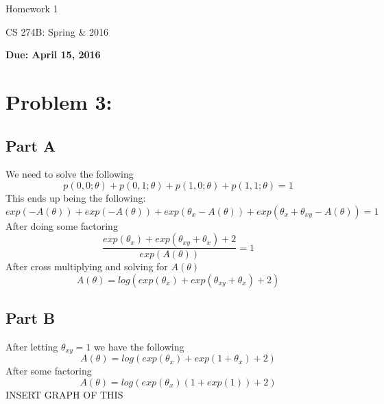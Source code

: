 \documentclass[twoside,11pt]{article}
\theoremstyle{definition}
\begin{document}
\centerline{\Large Homework 1}
\centerline{CS 274B: Spring \& 2016}
\centerline{\bf Due: April 15, 2016}


\section*{Problem 3: }

\subsection*{Part A}

We need to solve the following
\[
p(0,0;\theta) + p(0,1;\theta) + p(1,0;\theta) + p(1,1;\theta) = 1
\]
This ends up being the following:
\[
exp(-A(\theta)) + exp(-A(\theta)) + exp(\theta_x - A(\theta)) + exp(\theta_x + \theta_{xy} - A(\theta)) = 1
\]
After doing some factoring
\[
\frac{exp(\theta_x) + exp(\theta_{xy} + \theta_x) + 2}{exp(A(\theta))} = 1
\]
After cross multiplying and solving for $A(\theta)$
\[
A(\theta) = log( exp(\theta_x) + exp(\theta_{xy} + \theta_x) + 2 )
\]

\subsection*{Part B}
After letting $\theta_{xy} = 1$ we have the following
\[
A(\theta) = log( exp(\theta_x) + exp(1 + \theta_x) + 2 )
\]
After some factoring
\[
A(\theta) = log( exp(\theta_x)(1 + exp(1) ) + 2 )
\]
INSERT GRAPH OF THIS
\end{document}
